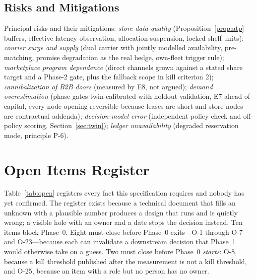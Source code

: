 \documentclass[10pt,twocolumn,letterpaper]{article}
\theoremstyle{definition}
\begin{document}
\subsection{Risks and Mitigations}
Principal risks and their mitigations: \emph{store data quality} (Proposition~\ref{prop:atp} buffers, effective-latency observation, allocation suspension, locked shelf units); \emph{courier surge and supply} (dual carrier with jointly modelled availability, pre-matching, promise degradation as the real hedge, own-fleet trigger rule); \emph{marketplace program dependence} (direct channels grown against a stated share target and a Phase-2 gate, plus the fallback scope in kill criterion 2); \emph{cannibalization of B2B doors} (measured by E8, not argued); \emph{demand overestimation} (phase gates twin-calibrated with holdout validation, E7 ahead of capital, every node opening reversible because leases are short and store nodes are contractual addenda); \emph{decision-model error} (independent policy check and off-policy scoring, Section~\ref{sec:twin}); \emph{ledger unavailability} (degraded reservation mode, principle P-6).

\section{Open Items Register}\label{sec:open}

Table~\ref{tab:open} registers every fact this specification requires and nobody has yet confirmed. The register exists because a technical document that fills an unknown with a plausible number produces a design that runs and is quietly wrong; a visible hole with an owner and a date stops the decision instead. Ten items block Phase~0. Eight must close before Phase~0 exits---O-1 through O-7 and O-23---because each can invalidate a downstream decision that Phase~1 would otherwise take on a guess. Two must close before Phase~0 \emph{starts}: O-8, because a kill threshold published after the measurement is not a kill threshold, and O-25, because an item with a role but no person has no owner.
\end{document}

